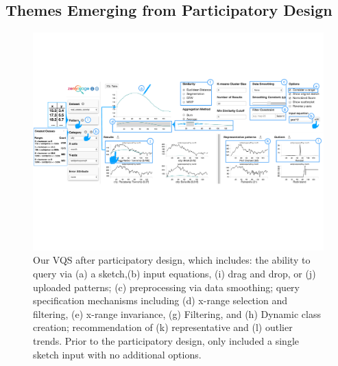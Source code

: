 \subsection{Themes Emerging from Participatory Design\label{sec:pd_findings}}
\begin{figure}[t!]
\centering
\vspace{-15pt}
\includegraphics[width=\linewidth]{figures/system.pdf} %
\vspace{-5pt}\caption{Our VQS after participatory design, which includes: the ability to query via (a) a sketch,(b) input equations, (i) drag and drop, or (j) uploaded patterns; (c) preprocessing via data smoothing; query specification mechanisms including (d) x-range selection and filtering, (e) x-range invariance, (g) Filtering, and (h) Dynamic class creation; recommendation of (k) representative and (l) outlier trends. Prior to the participatory design, \zv only included a single sketch input with no additional options.}
\label{zvOverview}
\vspace{-14pt}
\end{figure}

